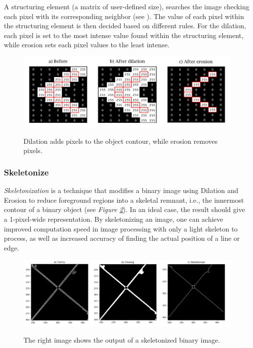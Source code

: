 \noindent A structuring element (a matrix of user-defined size), searches the image checking each pixel with its corresponding neighbor (see ). The value of each pixel within the structuring element is then decided based on different rules. For the dilation, each pixel is set to the most intense value found within the structuring element, while erosion sets each pixel values to the least intense. 

\begin{center}
\begin{figure}[htbp]
    \centering
    \includegraphics[width=1\linewidth]{figures/PDF/Morphological_dilate_erode.pdf}\\
    \caption{Dilation adds pixels to the object contour, while erosion
    removes pixels.}
    \label{fig:dilate and erode}
\end{figure}
\end{center}

\subsubsection{Skeletonize}
\textit{Skeletonization} \cite{Rakesh} is a technique that modifies a binary image using Dilation and Erosion to reduce foreground regions into a skeletal remnant, i.e., the innermost contour of a binary object (see \textit{Figure \ref{fig:skeletonize}}). In an ideal case, the result should give a 1-pixel-wide representation. By skeletonizing an image, one can achieve improved computation speed in image processing with only a light skeleton to process, as well as increased accuracy of finding the actual position of a line or edge.

\begin{figure}[htbp]
    \centering
    \includegraphics[width=0.8\linewidth]{figures/PDF/Skeletonize.pdf}\\
    \caption{The right image shows the output of a skeletonized binary image.}
    \label{fig:skeletonize}
\end{figure}

